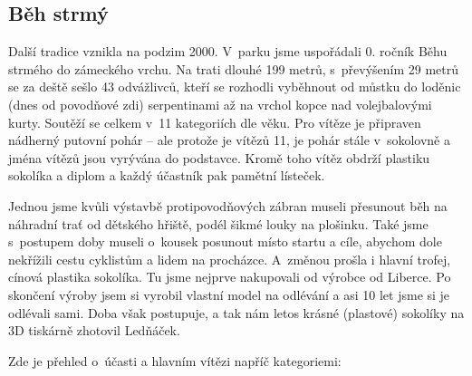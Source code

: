 \documentclass[a5paper, 11pt, twoside]{article}
\begin{document}
\subsection{Běh strmý}

Další tradice vznikla na podzim 2000. V~parku jsme uspořádali 0. ročník
Běhu strmého do zámeckého vrchu. Na trati dlouhé 199 metrů, s~převýšením
29 metrů se za deště sešlo 43 odvážlivců, kteří se rozhodli vyběhnout od
můstku do loděnic (dnes od povodňové zdi) serpentinami až na vrchol
kopce nad volejbalovými kurty. Soutěží se celkem v~11 kategoriích dle
věku. Pro vítěze je připraven nádherný putovní pohár -- ale protože je
vítězů 11, je pohár stále v~sokolovně a jména vítězů jsou vyrývána do
podstavce. Kromě toho vítěz obdrží plastiku sokolíka a diplom a každý
účastník pak pamětní lísteček.

Jednou jsme kvůli výstavbě protipovodňových zábran museli přesunout běh
na náhradní trať od dětského hřiště, podél šikmé louky na plošinku. Také
jsme s~postupem doby museli o~kousek posunout místo startu a cíle,
abychom dole nekřížili cestu cyklistům a lidem na procházce. A~změnou
prošla i hlavní trofej, cínová plastika sokolíka. Tu jsme nejprve
nakupovali od výrobce od Liberce. Po skončení výroby jsem si vyrobil
vlastní model na odlévání a asi 10 let jsme si je odlévali sami. Doba
však postupuje, a tak nám letos krásné (plastové) sokolíky na 3D
tiskárně zhotovil Ledňáček.

Zde je přehled o~účasti a hlavním vítězi napříč kategoriemi:
\end{document}
